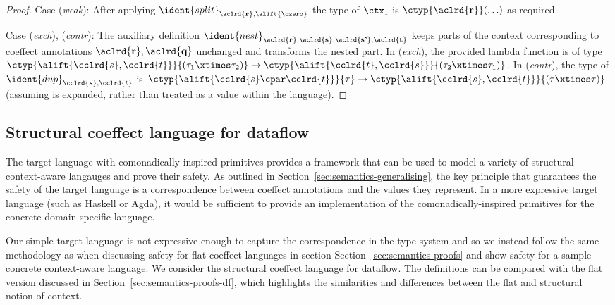 \begin{proof}
\vspace{0.25em}\noindent\hangindent=0.6cm
Case (\emph{weak}): After applying $\ident{split}_{\aclrd{\textbf{r}}, \alift{\czero}}$ the type of
  $\ctx_1$ is $\ctyp{\aclrd{\textbf{r}}}(\ldots)$ as required.

\vspace{0.25em}\noindent\hangindent=0.6cm
Case (\emph{exch}), (\emph{contr}): The auxiliary definition $\ident{nest}_{\aclrd{\textbf{r}}, \aclrd{\textbf{s}}, \aclrd{\textbf{s'}}, \aclrd{\textbf{t}}}$
  keeps parts of the context corresponding to coeffect annotations $\aclrd{\textbf{r}}, \aclrd{\textbf{q}}$ unchanged and transforms
  the nested part. In (\emph{exch}), the provided lambda function is of type $\ctyp{\alift{\cclrd{s},\cclrd{t}}}{(\tau_1\xtimes\tau_2)}
  \rightarrow \ctyp{\alift{\cclrd{t},\cclrd{s}}}{(\tau_2\xtimes\tau_1)}$. In (\emph{contr}), the type of
  $\ident{dup}_{\cclrd{s},\cclrd{t}}$ is $\ctyp{\alift{\cclrd{s}\cpar\cclrd{t}}}{\tau} \rightarrow \ctyp{\alift{\cclrd{s},\cclrd{t}}}{(\tau\xtimes\tau)}$
  (assuming  is expanded, rather than treated as a value within the language).
\end{proof}


\subsection{Structural coeffect language for dataflow}
\label{sec:struct-transl-safety}

The target language with comonadically-inspired primitives provides a framework that can be used
to model a variety of structural context-aware langauges and prove their safety. As outlined in
Section~\ref{sec:semantics-generalising}, the key principle that guarantees the safety of the
target language is a correspondence between coeffect annotations and the values they represent.
In a more expressive target language (such as Haskell or Agda), it would be sufficient to
provide an implementation of the comonadically-inspired primitives for the concrete domain-specific
language.

Our simple target language is not expressive enough to capture the correspondence in the type
system and so we instead follow the same methodology as when discussing safety for flat coeffect
languages in section Section~\ref{sec:semantics-proofs} and show safety for a sample concrete
context-aware language. We consider the structural coeffect language for dataflow. The definitions
can be compared with the flat version discussed in Section~\ref{sec:semantics-proofs-df}, which
highlights the similarities and differences between the flat and structural notion of context.

